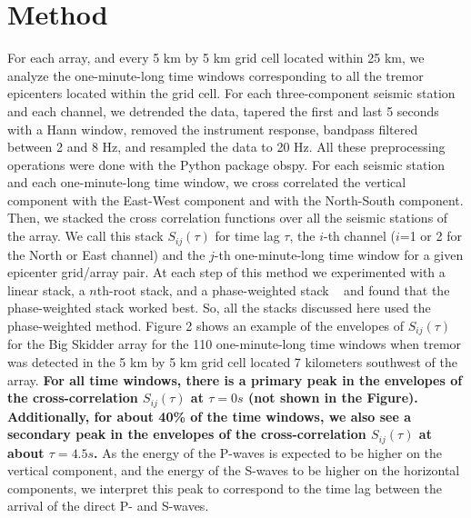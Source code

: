 \documentclass[draft]{agujournal2019}
\begin{document}
\section{Method}

For each array, and every 5 km by 5 km grid cell located within 25 km, we analyze the one-minute-long time windows corresponding to all the tremor epicenters located within the grid cell. For each three-component seismic station and each channel, we detrended the data, tapered the first and last 5 seconds with a Hann window, removed the instrument response, bandpass filtered between 2 and 8 Hz, and resampled the data to 20 Hz. All these preprocessing operations were done with the Python package obspy. For each seismic station and each one-minute-long time window, we cross correlated the vertical component with the East-West component and with the North-South component. Then, we stacked the cross correlation functions over all the seismic stations of the array. We call this stack $S_{i j} (\tau)$ for time lag $\tau$, the $i$-th channel ($i$=1 or 2 for the North or East channel) and the $j$-th one-minute-long time window for a given epicenter grid/array pair. At each step of this method we experimented with a linear stack, a $n$th-root stack, and a phase-weighted stack ~\cite{SCH_1997} and found that the phase-weighted stack worked best. So, all the stacks discussed here used the phase-weighted method.  Figure 2 shows an example of the envelopes of $S_{i j} (\tau)$ for the Big Skidder array for the 110 one-minute-long time windows when tremor was detected in the 5 km by 5 km grid cell located 7 kilometers southwest of the array. \textbf{For all time windows, there is a primary peak in the envelopes of the cross-correlation $S_{i j} (\tau)$ at $\tau = 0 s$ (not shown in the Figure). Additionally, for about 40\% of the time windows, we also see a secondary peak in the envelopes of the cross-correlation $S_{i j} (\tau)$ at about $\tau = 4.5 s$.} As the energy of the P-waves is expected to be higher on the vertical component, and the energy of the S-waves to be higher on the horizontal components, we interpret this peak to correspond to the time lag between the arrival of the direct P- and S-waves. \\
\end{document}
